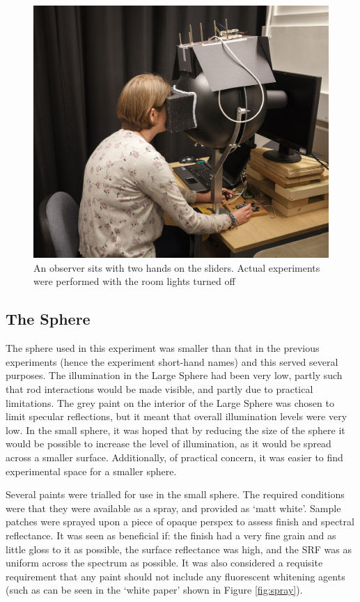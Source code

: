 \begin{figure}[htbp]
\includegraphics[max width=\textwidth,center]{figs/SmallSphere/SSphoto.jpg}
\caption{An observer sits with two hands on the sliders. Actual experiments were performed with the room lights turned off}
\label{fig:SSphoto}
\end{figure}

\subsection{The Sphere}

The sphere used in this experiment was smaller than that in the previous experiments (hence the experiment short-hand names) and this served several purposes. The illumination in the Large Sphere had been very low, partly such that rod interactions would be made visible, and partly due to practical limitations. The grey paint on the interior of the Large Sphere was chosen to limit specular reflections, but it meant that overall illumination levels were very low. In the small sphere, it was hoped that by reducing the size of the sphere it would be possible to increase the level of illumination, as it would be spread across a smaller surface. Additionally, of practical concern, it was easier to find experimental space for a smaller sphere.

Several paints were trialled for use in the small sphere. The required conditions were that they were available as a spray, and provided as `matt white'. Sample patches were sprayed upon a piece of opaque perspex to assess finish and spectral reflectance. It was seen as beneficial if: the finish had a very fine grain and as little gloss to it as possible, the surface reflectance was high, and the \gls{SRF} was as uniform across the spectrum as possible. It was also considered a requisite requirement that any paint should not include any fluorescent whitening agents (such as can be seen in the `white paper' shown in Figure \ref{fig:spray}).

